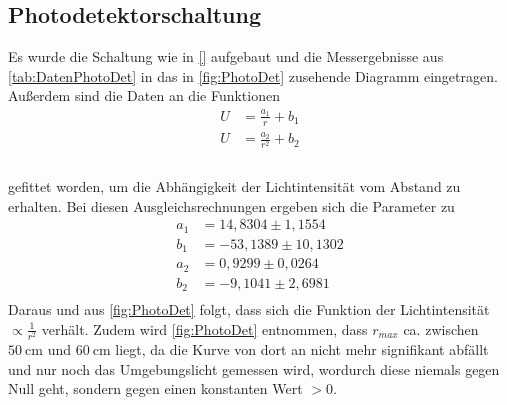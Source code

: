 \subsection{Photodetektorschaltung}
\label{subsec:PhotDet}
Es wurde die Schaltung wie in \autoref{} aufgebaut und die Messergebnisse aus \autoref{tab:DatenPhotoDet} in das in \autoref{fig:PhotoDet} zusehende Diagramm eingetragen.
Außerdem sind die Daten an die Funktionen
\begin{align*}
    U &= \frac{a_1}{r} + b_1\\
    U &= \frac{a_2}{r^2} + b_2\\
\end{align*}
\\
gefittet worden, um die Abhängigkeit der Lichtintensität vom Abstand zu erhalten. Bei diesen Ausgleichsrechnungen ergeben sich die Parameter zu
\begin{align*}
  a_1 &= 14,8304\pm 1,1554\\
  b_1 &= -53,1389\pm 10,1302\\
  a_2 &= 0,9299\pm 0,0264\\
  b_2 &= -9,1041\pm 2,6981\\
\end{align*}
Daraus und aus \autoref{fig:PhotoDet} folgt, dass sich die Funktion der Lichtintensität $\varpropto \frac{1}{r^2}$ verhält. Zudem wird \autoref{fig:PhotoDet}
entnommen, dass $r_{max}$ ca. zwischen $\SI{50}{\centi\meter}$ und $\SI{60}{\centi\meter}$ liegt, da die Kurve von dort an nicht mehr signifikant abfällt und nur noch
das Umgebungslicht gemessen wird, wordurch diese niemals gegen Null geht, sondern gegen einen konstanten Wert $>0$.

